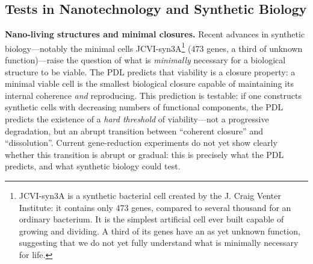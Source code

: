 \documentclass[12pt, a4paper, openright]{book}
\begin{document}
\subsection*{Tests in Nanotechnology and Synthetic Biology}

\textbf{Nano-living structures and minimal closures.} Recent advances in synthetic biology---notably the minimal cells JCVI-syn3A\footnote{JCVI-syn3A is a synthetic bacterial cell created by the J. Craig Venter Institute: it contains only 473 genes, compared to several thousand for an ordinary bacterium. It is the simplest artificial cell ever built capable of growing and dividing. A third of its genes have an as yet unknown function, suggesting that we do not yet fully understand what is minimally necessary for life.} (473 genes, a third of unknown function)---raise the question of what is \emph{minimally} necessary for a biological structure to be viable. The PDL predicts that viability is a closure property: a minimal viable cell is the smallest biological closure capable of maintaining its internal coherence \emph{and} reproducing. This prediction is testable: if one constructs synthetic cells with decreasing numbers of functional components, the PDL predicts the existence of a \emph{hard threshold} of viability---not a progressive degradation, but an abrupt transition between ``coherent closure'' and ``dissolution''. Current gene-reduction experiments do not yet show clearly whether this transition is abrupt or gradual: this is precisely what the PDL predicts, and what synthetic biology could test.

\medskip
\end{document}

